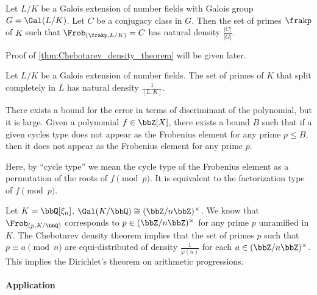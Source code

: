     \begin{theorem}\label{thm:Chebotarev_density_theorem}
        Let \(L/K\) be a Galois extension of number fields with Galois group \(G = \Gal(L/K)\).
        Let \(C\) be a conjugacy class in \(G\).
        Then the set of primes \(\frakp\) of \(K\) such that \(\Frob_{(\frakp, L/K)} = C\) has natural density \(\frac{|C|}{|G|}\).
    \end{theorem}

    Proof of \cref{thm:Chebotarev_density_theorem} will be given later.

    \begin{corollary}
        Let \(L/K\) be a Galois extension of number fields.
        The set of primes of \(K\) that split completely in \(L\) has natural density \(\frac{1}{[L:K]}\).
    \end{corollary}

    \begin{remark}
        There exists a bound for the error in terms of discriminant of the polynomial, 
        but it is large.
        Given a polynomial \(f \in \bbZ[X]\), there exists a bound \(B\) 
        such that if a given cycles type does not appear as the Frobenius element for any prime \(p \leq B\), 
        then it does not appear as the Frobenius element for any prime \(p\).

        Here, by ``cycle type'' we mean the cycle type of the Frobenius element as a permutation of the roots of \(f \pmod{p}\).
        It is equivalent to the factorization type of \(f \pmod{p}\).
    \end{remark}

    \begin{example}
        Let \(K = \bbQ[\xi_n]\), \(\Gal(K/\bbQ) \cong (\bbZ/n\bbZ)^\times\).
        We know that \(\Frob_{(p, K/\bbQ)}\) corresponds to \(p \in (\bbZ/n\bbZ)^\times\) for any prime \(p\) unramified in \(K\).
        The Chebotarev density theorem implies that 
        the set of primes \(p\) such that \(p \equiv a \pmod{n}\) are equi-distributed of density \(\frac{1}{\varphi(n)}\) for each \(a \in (\bbZ/n\bbZ)^\times\).
        This implies the Dirichlet's theorem on arithmetic progressions.
    \end{example}

    \paragraph{Application}

